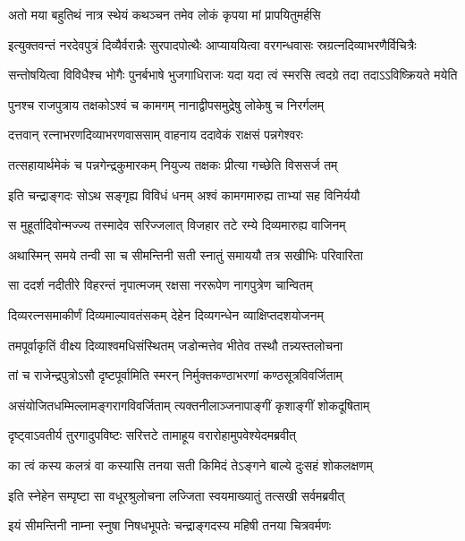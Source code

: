 \begin{center}
\twolineshloka
{अतो मया बहुतिथं नात्र स्थेयं कथञ्चन}
{तमेव लोकं कृपया मां प्रापयितुमर्हसि} %

\fourlineindentedshloka
{इत्युक्तवन्तं नरदेवपुत्रं}
{दिव्यैर्वरान्नैः सुरपादपोत्थैः}
{आप्याययित्वा वरगन्धवासः}
{स्रग्रत्नदिव्याभरणैर्विचित्रैः} %

\fourlineindentedshloka
{सन्तोषयित्वा विविधैश्च भोगैः}
{पुनर्बभाषे भुजगाधिराजः}
{यदा यदा त्वं स्मरसि त्वदग्रे}
{तदा तदाऽऽविष्क्रियते मयेति} %

\twolineshloka
{पुनश्च राजपुत्राय तक्षकोऽश्वं च कामगम्}
{नानाद्वीपसमुद्रेषु लोकेषु च निरर्गलम्} %

\twolineshloka
{दत्तवान् रत्नाभरणदिव्याभरणवाससाम्}
{वाहनाय ददावेकं राक्षसं पन्नगेश्वरः} %

\twolineshloka
{तत्सहायार्थमेकं च पन्नगेन्द्रकुमारकम्}
{नियुज्य तक्षकः प्रीत्या गच्छेति विससर्ज तम्} %

\twolineshloka
{इति चन्द्राङ्गदः सोऽथ सङ्गृह्य विविधं धनम्}
{अश्वं कामगमारुह्य ताभ्यां सह विनिर्ययौ} %

\twolineshloka
{स मुहूर्तादिवोन्मज्ज्य तस्मादेव सरिज्जलात्}
{विजहार तटे रम्ये दिव्यमारुह्य वाजिनम्} %

\twolineshloka
{अथास्मिन् समये तन्वी सा च सीमन्तिनी सती}
{स्नातुं समाययौ तत्र सखीभिः परिवारिता} %

\twolineshloka
{सा ददर्श नदीतीरे विहरन्तं नृपात्मजम्}
{रक्षसा नररूपेण नागपुत्रेण चान्वितम्} %

\twolineshloka
{दिव्यरत्नसमाकीर्णं दिव्यमाल्यावतंसकम्}
{देहेन दिव्यगन्धेन व्याक्षिप्तदशयोजनम्} %

\twolineshloka
{तमपूर्वाकृतिं वीक्ष्य दिव्याश्वमधिसंस्थितम्}
{जडोन्मत्तेव भीतेव तस्थौ तन्न्यस्तलोचना} %

\twolineshloka
{तां च राजेन्द्रपुत्रोऽसौ दृष्टपूर्वामिति स्मरन्}
{निर्मुक्तकण्ठाभरणां कण्ठसूत्रविवर्जिताम्} %

\twolineshloka
{असंयोजितधम्मिल्लामङ्गरागविवर्जिताम्}
{त्यक्तनीलाञ्जनापाङ्गीं कृशाङ्गीं शोकदूषिताम्} %

\twolineshloka
{दृष्ट्वाऽवतीर्य तुरगादुपविष्टः सरित्तटे}
{तामाहूय वरारोहामुपवेश्येदमब्रवीत्} %

\twolineshloka
{का त्वं कस्य कलत्रं वा कस्यासि तनया सती}
{किमिदं तेऽङ्गने बाल्ये दुःसहं शोकलक्षणम्} %

\twolineshloka
{इति स्नेहेन सम्पृष्टा सा वधूरश्रुलोचना}
{लज्जिता स्वयमाख्यातुं तत्सखी सर्वमब्रवीत्} %

\twolineshloka
{इयं सीमन्तिनी नाम्ना स्नुषा निषधभूपतेः}
{चन्द्राङ्गदस्य महिषी तनया चित्रवर्मणः} %


\end{center}
